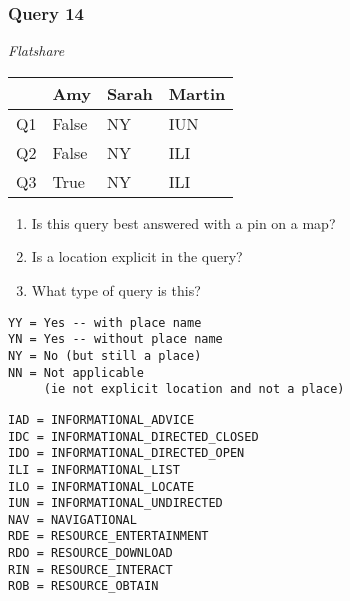 \begin{frame}[fragile]
\frametitle{Query 14}
\vspace{1em}

\emph{Flatshare}

\vfill

\begin{table}
  \centering
  \begin{tabular}{ l l l l }
    & \textbf{Amy} & \textbf{Sarah} & \textbf{Martin}\\
    \toprule
    Q1 & False & NY & IUN\\
Q2 & False & NY & ILI\\
Q3 & True & NY & ILI\\
    \bottomrule
  \end{tabular}
\end{table}

\vfill

\tiny{

\begin{enumerate}
\item Is this query best answered with a pin on a map?
\item Is a location explicit in the query?
\item What type of query is this?
\end{enumerate}

\vfill

\begin{multicols}{2}
\begin{verbatim}
YY = Yes -- with place name
YN = Yes -- without place name
NY = No (but still a place)
NN = Not applicable 
     (ie not explicit location and not a place)
\end{verbatim}

\columnbreak
\begin{verbatim}
IAD = INFORMATIONAL_ADVICE
IDC = INFORMATIONAL_DIRECTED_CLOSED
IDO = INFORMATIONAL_DIRECTED_OPEN
ILI = INFORMATIONAL_LIST
ILO = INFORMATIONAL_LOCATE
IUN = INFORMATIONAL_UNDIRECTED
NAV = NAVIGATIONAL
RDE = RESOURCE_ENTERTAINMENT
RDO = RESOURCE_DOWNLOAD
RIN = RESOURCE_INTERACT
ROB = RESOURCE_OBTAIN
\end{verbatim}
\end{multicols}
}

\end{frame}



